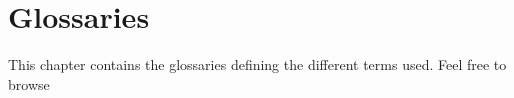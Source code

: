 \chapter{Glossaries}
This chapter contains the glossaries defining the different terms used.
Feel free to browse

\printglossary[type=tribe]{}
\printglossary[type=good]{}
\printglossary[type=biome]{}